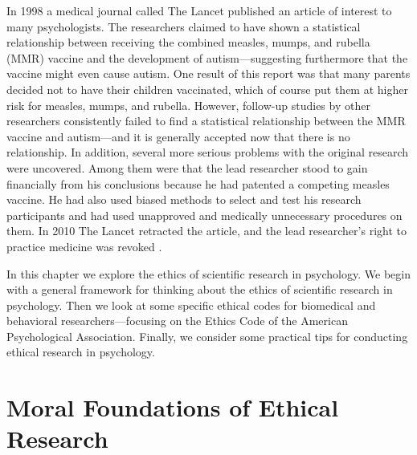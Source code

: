 

In 1998 a medical journal called The Lancet published an article of interest to many psychologists. The researchers claimed to have shown a statistical relationship between receiving the combined measles, mumps, and rubella (MMR) vaccine and the development of autism---suggesting furthermore that the vaccine might even cause autism. One result of this report was that many parents decided not to have their children vaccinated, which of course put them at higher risk for measles, mumps, and rubella. However, follow-up studies by other researchers consistently failed to find a statistical relationship between the MMR vaccine and autism---and it is generally accepted now that there is no relationship. In addition, several more serious problems with the original research were uncovered. Among them were that the lead researcher stood to gain financially from his conclusions because he had patented a competing measles vaccine. He had also used biased methods to select and test his research participants and had used unapproved and medically unnecessary procedures on them. In 2010 The Lancet retracted the article, and the lead researcher's right to practice medicine was revoked \citep{burns_council_2010}.

In this chapter we explore the ethics of scientific research in psychology. We begin with a general framework for thinking about the ethics of scientific research in psychology. Then we look at some specific ethical codes for biomedical and behavioral researchers---focusing on the Ethics Code of the American Psychological Association. Finally, we consider some practical tips for conducting ethical research in psychology.

\section{Moral Foundations of Ethical Research}


